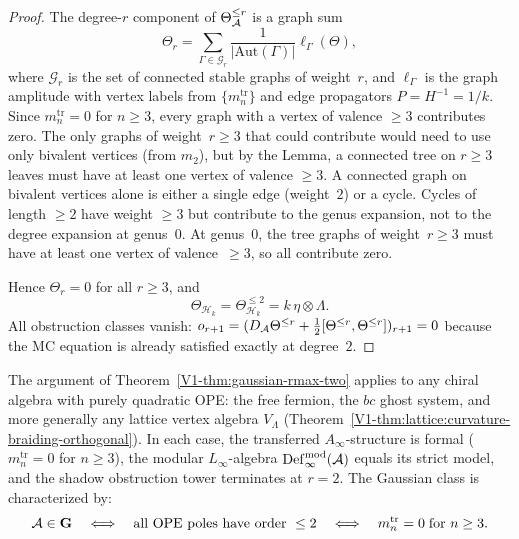 \begin{proof}
\medskip
The degree-$r$ component of $\Theta_{\mathcal{A}}^{\leq r}$ is
a graph sum
\[
\Theta_r = \sum_{\Gamma \in \mathcal{G}_r}
\frac{1}{|\mathrm{Aut}(\Gamma)|}
\ell_\Gamma(\Theta),
\]
where $\mathcal{G}_r$ is the set of connected stable
graphs of weight~$r$, and $\ell_\Gamma$ is the graph
amplitude with vertex labels from $\{m_n^{\mathrm{tr}}\}$
and edge propagators $P = H^{-1} = 1/k$. Since
$m_n^{\mathrm{tr}} = 0$ for $n \geq 3$, every graph with
a vertex of valence $\geq 3$ contributes zero. The only
graphs of weight~$r \geq 3$ that could contribute would
need to use only bivalent vertices (from $m_2$), but by
the Lemma, a connected tree on $r \geq 3$ leaves must
have at least one vertex of valence $\geq 3$.
A connected graph on bivalent vertices alone is either a
single edge (weight~$2$) or a cycle. Cycles of length
$\geq 2$ have weight $\geq 3$ but contribute to the
genus expansion, not to the degree expansion at genus~$0$.
At genus~$0$, the tree graphs of weight~$r \geq 3$ must
have at least one vertex of valence~$\geq 3$, so all
contribute zero.

Hence $\Theta_r = 0$ for all $r \geq 3$, and
\begin{equation}%
\Theta_{\mathcal{H}_k} = \Theta^{\leq 2}_{\mathcal{H}_k}
= k\,\eta \otimes \Lambda.
\end{equation}
All obstruction classes vanish:
$o_{r+1} = (D_{\mathcal{A}} \Theta^{\leq r} +
\frac{1}{2}[\Theta^{\leq r}, \Theta^{\leq r}])_{r+1}
= 0$ because the MC equation is already satisfied
exactly at degree~$2$.
\end{proof}

\begin{remark}
The argument of Theorem~\ref{V1-thm:gaussian-rmax-two}
applies to any chiral algebra with purely quadratic OPE:
the free fermion, the $bc$ ghost system, and more generally
any lattice vertex algebra $V_\Lambda$
(Theorem~\ref{V1-thm:lattice:curvature-braiding-orthogonal}).
In each case, the transferred $A_\infty$-structure is
formal ($m_n^{\mathrm{tr}} = 0$ for $n \geq 3$),
the modular $L_\infty$-algebra $\operatorname{Def}_{\infty}^{\mathrm{mod}}(\mathcal{A})$ equals
its strict model, and the shadow obstruction tower terminates at
$r = 2$. The Gaussian class is characterized by:
\begin{equation}%
\cA \in \textbf{G}
\quad\Longleftrightarrow\quad
\text{all OPE poles have order } \leq 2
\quad\Longleftrightarrow\quad
m_n^{\mathrm{tr}} = 0 \;\text{for } n \geq 3.
\end{equation}
\end{remark}

